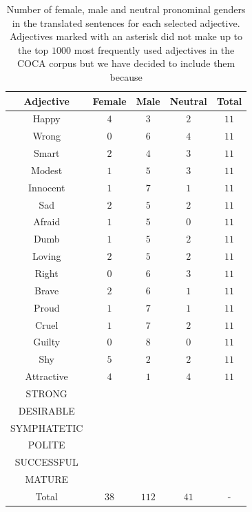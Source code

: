 \documentclass[fleqn,10pt]{article}
\begin{document}
\begin{table}[H]
\small{
	\centering
	\begin{tabular}{|c|c|c|c|c|}
	\hline
	Adjective 	& Female 	& Male 	& Neutral 	& Total 	\\ \hline
	\hline
	Happy			& $4$		& $3$	& $2$		& $11$		\\ \hline
	Wrong			& $0$		& $6$	& $4$		& $11$		\\ \hline
	Smart			& $2$		& $4$	& $3$		& $11$		\\ \hline
	Modest			& $1$		& $5$	& $3$		& $11$		\\ \hline
	Innocent		& $1$		& $7$	& $1$		& $11$		\\ \hline
	Sad				& $2$		& $5$	& $2$		& $11$		\\ \hline
	Afraid			& $1$		& $5$	& $0$		& $11$		\\ \hline
	Dumb			& $1$		& $5$	& $2$		& $11$		\\ \hline
	Loving			& $2$		& $5$	& $2$		& $11$		\\ \hline
	Right			& $0$		& $6$	& $3$		& $11$		\\ \hline
	Brave			& $2$		& $6$	& $1$		& $11$		\\ \hline
	Proud			& $1$		& $7$	& $1$		& $11$		\\ \hline
	Cruel			& $1$		& $7$	& $2$		& $11$		\\ \hline
	Guilty			& $0$		& $8$	& $0$		& $11$		\\ \hline
	Shy				& $5$		& $2$	& $2$		& $11$		\\ \hline
	Attractive		& $4$		& $1$	& $4$		& $11$		\\ \hline
	STRONG			&			&		&			&			\\ \hline
	DESIRABLE		&			&		&			&			\\ \hline
	SYMPHATETIC		&			&		&			&			\\ \hline
	POLITE			&			&		&			&			\\ \hline
	SUCCESSFUL		&			&		&			&			\\ \hline
	MATURE			&			&		&			&			\\ \hline \hline
	Total 			& $38$		& $112$	& $41$		& -			\\ \hline 
	\end{tabular}
	\caption{Number of female, male and neutral pronominal genders in the translated sentences for each selected adjective. Adjectives marked with an asterisk did not make up to the top $1000$ most frequently used adjectives in the COCA corpus but we have decided to include them because }
	\label{tab:gender-by-adjective}
	}
\end{table}
\end{document}
